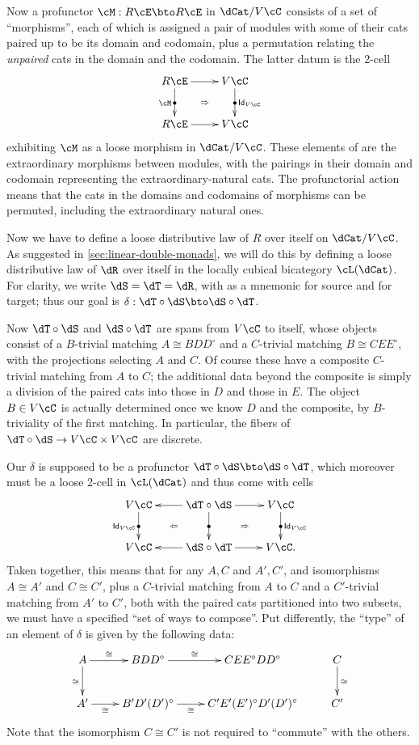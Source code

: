 \documentclass{amsart}
\let\oc\circ
\newcommand{\C}{\cC}
\newcommand{\E}{\cE}
\newcommand{\hunit}[1]{\Id_{#1}}
\newcommand{\dl}{\delta}
\renewcommand{\o}{^{\circ}}
\newcommand{\Id}{\mathsf{Id}}
\begin{document}
Now a profunctor $\cM:R\E \bto R\E$ in $\dCat/V\C$ consists of a set of ``morphisms'', each of which is assigned a pair of modules with some of their cats paired up to be its domain and codomain, plus a permutation relating the \emph{unpaired} cats in the domain and the codomain.
The latter datum is the 2-cell
\[ \xymatrix{ R\E \ar[d]|{\bullet}_{\cM} \ar[r] \ar@{}[dr]|{\Rightarrow} & V\C \ar[d]|{\bullet}^{\hunit {V\C}} \\ R\E \ar[r] & V \C } \]
exhibiting $\cM$ as a loose morphism in $\dCat/V\C$.
These elements of \cM are the extraordinary morphisms between modules, with the pairings in their domain and codomain representing the extraordinary-natural cats.
The profunctorial action means that the cats in the domains and codomains of morphisms can be permuted, including the extraordinary natural ones.

Now we have to define a loose distributive law of $R$ over itself on $\dCat/V\C$.
As suggested in \cref{sec:linear-double-monads}, we will do this by defining a loose distributive law of $\dR$ over itself in the locally cubical bicategory $\cL(\dCat)$.
For clarity, we write $\dS=\dT=\dR$, with \dS as a mnemonic for source and \dT for target; thus our goal is $\dl : \dT \oc \dS \bto \dS \oc \dT$.

Now $\dT\oc \dS$ and $\dS\oc \dT$ are spans from $V\C$ to itself, whose objects consist of a $B$-trivial matching $A\cong B D D\o$ and a $C$-trivial matching $B \cong C E E\o$, with the projections selecting $A$ and $C$.
Of course these have a composite $C$-trivial matching from $A$ to $C$; the additional data beyond the composite is simply a division of the paired cats into those in $D$ and those in $E$.
The object $B\in V\C$ is actually determined once we know $D$ and the composite, by $B$-triviality of the first matching.
In particular, the fibers of $\dT\oc \dS \to V\C \times V\C$ are discrete.

Our $\delta$ is supposed to be a profunctor $\dT \oc \dS \bto \dS \oc \dT$, which moreover must be a loose 2-cell in $\cL(\dCat)$ and thus come with cells
\[ \xymatrix{ V\C \ar[d]|{\bullet}_{\hunit {V\C}} \ar@{}[dr]|{\Leftarrow} &
  \dT\oc \dS \ar[l] \ar[d]|{\bullet} \ar[r] \ar@{}[dr]|{\Rightarrow} &
  V\C \ar[d]|{\bullet}^{\hunit {V\C}}\\
  V\C & \dS\oc\dT \ar[l] \ar[r] & V\C. } \]
Taken together, this means that for any $A,C$ and $A',C'$, and isomorphisms $A\cong A'$ and $C\cong C'$, plus a $C$-trivial matching from $A$ to $C$ and a $C'$-trivial matching from $A'$ to $C'$, both with the paired cats partitioned into two subsets, we must have a specified ``set of ways to compose''.
Put differently, the ``type'' of an element of $\dl$ is given by the following data:
\begin{equation}
  \xymatrix{ A \ar[d]_\cong \ar[r]^-\cong & B D D\o \ar[r]^-\cong & C E E\o D D\o & C \ar[d]^\cong \\
    A' \ar[r]_-\cong & B' D' (D')\o \ar[r]_-\cong & C' E' (E')\o D' (D')\o & C' }\label{eq:dl-type-1}
\end{equation}
Note that the isomorphism $C\cong C'$ is not required to ``commute'' with the others.
\end{document}
